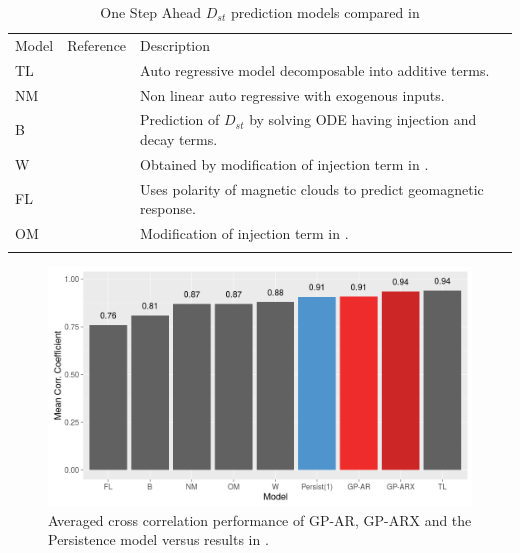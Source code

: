 \documentclass[referee,a4paper,12pt,traditabstract]{swsc}
\begin{document}
\begin{linenumbers}
\begin{table}
      \caption[]{One Step Ahead $D_{st}$ prediction models compared in \citet{Ji2012}}
         \label{table:DstModels}
      
         \begin{tabular}{lll}
            \hline
            \noalign{\smallskip}
            Model  &  Reference  &  Description \\
            \noalign{\smallskip}
            \hline
            \noalign{\smallskip}
            TL & \citet{JGRA:JGRA16300} & Auto regressive model decomposable into additive terms.      \\
            NM & \citet{balikhin:narmax} & Non linear auto regressive with exogenous inputs. \\
            B & \citet{JGR:JGR10260} & Prediction of $D_{st}$ by solving ODE having injection and decay terms. \\
            W & \citet{Wang:Dst} & Obtained by modification of injection term in \citet{JGR:JGR10260}. \\
            FL & \citet{GRL:GRL11549} & Uses polarity of magnetic clouds to predict geomagnetic response.\\
            OM & \citet{JGRA:JGRA14856} & Modification of injection term in \citet{JGR:JGR10260}.\\
            \noalign{\smallskip}
            \hline
         \end{tabular}
\end{table}

\begin{figure}
   \centering
   \includegraphics[width=\textwidth]{Compare_CC.png}
      \caption{Averaged cross correlation performance of GP-AR, GP-ARX and the Persistence model versus results in \citet{Ji2012}.}
         \label{fig:cc}
   \end{figure}




\end{linenumbers}
\end{document}
